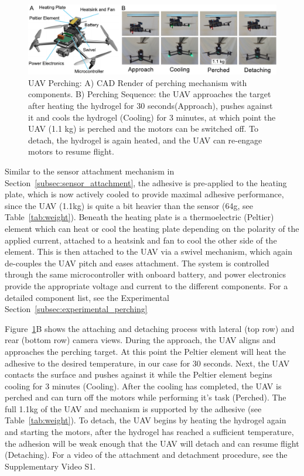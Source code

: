 \begin{figure}
  \includegraphics[width=\linewidth]{figures/fig-5-perching-placeholder/fig-5-perching-placeholder.pdf}
  \caption{UAV Perching: A) CAD Render of perching mechanism with components. B) Perching Sequence: the UAV approaches the target after heating the hydrogel for 30 seconds(Approach), pushes against it and cools the hydrogel (Cooling) for 3 minutes, at which point the UAV (1.1 kg) is perched and the motors can be switched off. To detach, the hydrogel is again heated, and the UAV can re-engage motors to resume flight.}
  \label{fig:fig5-placeholder}
\end{figure}
Similar to the sensor attachment mechanism in Section~\ref{subsec:sensor_attachment}, the adhesive is pre-applied to the heating plate, which is now actively cooled to provide maximal adhesive performance, since the UAV (1.1kg) is quite a bit heavier than the sensor (64g, see Table~\ref{tab:weight}). Beneath the heating plate is a thermoelectric (Peltier) element which can heat or cool the heating plate depending on the polarity of the applied current, attached to a heatsink and fan to cool the other side of the element. This is then attached to the UAV via a swivel mechanism, which again de-couples the UAV pitch and eases attachment. The system is controlled through the same microcontroller with onboard battery, and power electronics provide the appropriate voltage and current to the different components. For a detailed component list, see the Experimental Section~\ref{subsec:experimental_perching}

Figure~\ref{fig:fig5-placeholder}B shows the attaching and detaching process with lateral (top row) and rear (bottom row) camera views. During the approach, the UAV aligns and approaches the perching target. At this point the Peltier element will heat the adhesive to the desired temperature, in our case for 30 seconds. Next, the UAV contacts the surface and pushes against it while the Peltier element begins cooling for 3 minutes (Cooling). After the cooling has completed, the UAV is perched and can turn off the motors while performing it's task (Perched). The full 1.1kg of the UAV and mechanism is supported by the adhesive (see Table~\ref{tab:weight}). To detach, the UAV begins by heating the hydrogel again and starting the motors, after the hydrogel has reached a sufficient temperature, the adhesion will be weak enough that the UAV will detach and can resume flight (Detaching). For a video of the attachment and detachment procedure, see the Supplementary Video S1.


